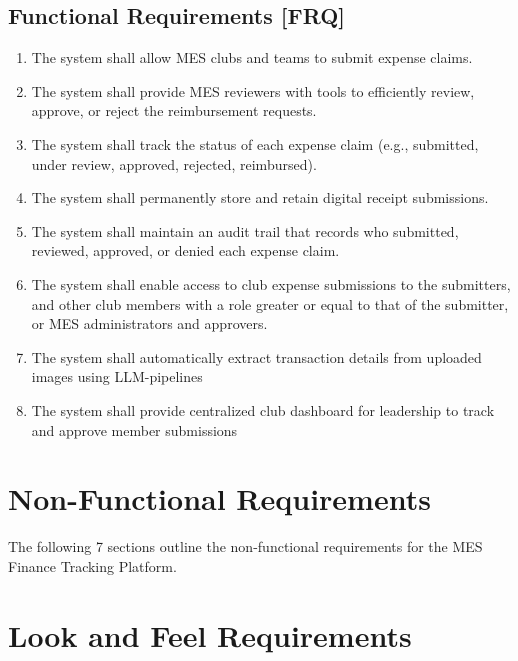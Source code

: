\documentclass[12pt]{article}
\begin{document}
  \subsection{Functional Requirements [FRQ]}
    \begin{enumerate}
      \item The system shall allow MES clubs and teams to submit expense claims. 
      \item The system shall provide MES reviewers with tools to efficiently review, approve, or reject the reimbursement requests.
      \item The system shall track the status of each expense claim (e.g., submitted, under review, approved, rejected, reimbursed).
      \item The system shall permanently store and retain digital receipt submissions.
      \item The system shall maintain an audit trail that records who submitted, reviewed, approved, or denied each expense claim.
      \item The system shall enable access to club expense submissions to the submitters, and other club members with a role greater or equal to that of the submitter, or MES administrators and approvers.
      \item The system shall automatically extract transaction details from uploaded images using LLM-pipelines
      \item The system shall provide centralized club dashboard for leadership to track and approve member submissions
    \end{enumerate}

\section{Non-Functional Requirements}

The following 7 sections outline the non-functional requirements for the MES Finance Tracking Platform.

\section{Look and Feel Requirements}
\end{document}
